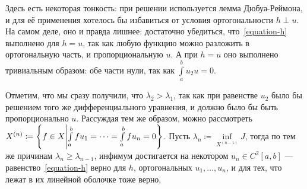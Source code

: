 \documentclass[a4paper]{article}
\begin{document}
    Здесь есть некоторая тонкость: при решении используется лемма Дюбуа-Реймона, и для её применения хотелось бы избавиться от условия ортогональности $h \perp u$.
    На самом деле, оно и правда лишнее: достаточно убедиться, что~\eqref{equation-h} выполнено для $h = u$, так как любую функцию можно разложить в ортогональную часть, и пропорциональную $u$.
    А при $h = u$ оно выполнено тривиальным образом: обе части нули, так как $\int\limits_{a}^{b}u_2 u = 0$.

    Отметим, что мы сразу получили, что $\lambda_2 > \lambda_1$, так как при равенстве $u_2$ было бы решением того же дифференциального уравнения, и должно было бы быть пропорционально $u$.
    Рассуждая тем же образом, можно рассмотреть $X^{(n)} \coloneqq \left\{f \in X\middle|\int\limits_{a}^{b}fu_1 = \dots = \int\limits_{a}^{b}fu_{n} = 0\right\}$.
    Пусть $\lambda_n \coloneqq \inf\limits_{X^{(n-1)}}J$, тогда по тем же причинам $\lambda_n \ge \lambda_{n-1}$, инфимум достигается на некотором $u_n \in C^2[a, b]$ --- равенство~\eqref{equation-h} верно для $h$, ортогональных $u_1, \dots, u_n$, и для тех, что лежат в их линейной оболочке тоже верно,
\end{document}
